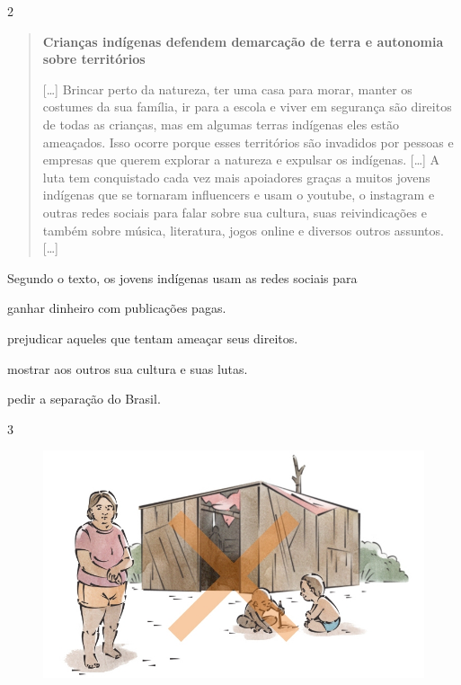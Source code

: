 \num{2}

\begin{quote}
\textbf{Crianças indígenas defendem demarcação de terra e autonomia
sobre territórios}

{[}\ldots{}{]}
Brincar perto da natureza, ter uma casa para morar, manter os costumes
da sua família, ir para a escola e viver em segurança são direitos de
todas as crianças, mas em algumas terras indígenas eles estão ameaçados.
Isso ocorre porque esses territórios são invadidos por pessoas e
empresas que querem explorar a natureza e expulsar os indígenas. {[}\ldots{}{]} 
A luta
tem conquistado cada vez mais apoiadores graças a muitos jovens
indígenas que se tornaram influencers e usam o youtube, o instagram e
outras redes sociais para falar sobre sua cultura, suas reivindicações e
também sobre música, literatura, jogos online e diversos outros
assuntos. {[}\ldots{}{]}

\end{quote}

Segundo o texto, os jovens indígenas usam as redes sociais para

\begin{escolha}
\item ganhar dinheiro com publicações pagas.

\item prejudicar aqueles que tentam ameaçar seus direitos.

\item mostrar aos outros sua cultura e suas lutas.

\item pedir a separação do Brasil.
\end{escolha}


\pagebreak
\num{3}

\begin{figure}[htpb!]
\includegraphics[width=\textwidth]{./imgs/img52.jpg}
\end{figure}

